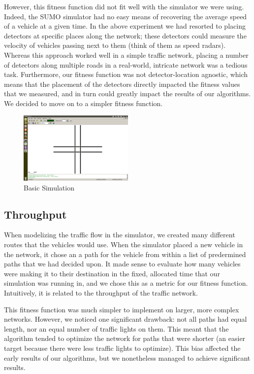 \documentclass{article} %
\begin{document}
However, this fitness function did not fit well with the simulator we were using. Indeed, the SUMO simulator had no easy means of recovering the average speed of a vehicle at a given time. In the above experiment we had resorted to placing detectors at specific places along the network; these detectors could measure the velocity of vehicles passing next to them (think of them as speed radars). Whereas this approach worked well in a simple traffic network, placing a number of detectors along multiple roads in a real-world, intricate network was a tedious task. Furthermore, our fitness function was not detector-location agnostic, which means that the placement of the detectors directly impacted the fitness values that we measured, and in turn could greatly impact the results of our algorithms. We decided to move on to a simpler fitness function.

\begin{figure}[h]
\centering
\includegraphics[width=0.5\textwidth]{images/simulator/gridoptimum.png}
\caption{Basic Simulation}
\label{fig:gridoptimum}
\end{figure}

\subsection{Throughput}
When modelizing the traffic flow in the simulator, we created many different routes that the vehicles would use. When the simulator placed a new vehicle in the network, it chose an a path for the vehicle from within a list of predermined paths that we had decided upon. It made sense to evaluate how many vehicles were making it to their destination in the fixed, allocated time that our simulation was running in, and we chose this as a metric for our fitness function. Intuitively, it is related to the throughput of the traffic network.

This fitness function was much simpler to implement on larger, more complex networks. However, we noticed one significant drawback: not all paths had equal length, nor an equal number of traffic lights on them. This meant that the algorithm tended to optimize the network for paths that were shorter (an easier target because there were less traffic lights to optimize). This bias affected the early results of our algorithms, but we nonetheless managed to achieve significant results.
\end{document}
